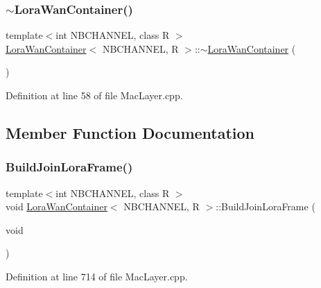 \subsubsection{\texorpdfstring{$\sim$\+Lora\+Wan\+Container()}{~LoraWanContainer()}}
{\footnotesize\ttfamily template$<$int N\+B\+C\+H\+A\+N\+N\+EL, class R $>$ \\
\mbox{\hyperlink{class_lora_wan_container}{Lora\+Wan\+Container}}$<$ N\+B\+C\+H\+A\+N\+N\+EL, R $>$\+::$\sim$\mbox{\hyperlink{class_lora_wan_container}{Lora\+Wan\+Container}} (\begin{DoxyParamCaption}{ }\end{DoxyParamCaption})}



Definition at line 58 of file Mac\+Layer.\+cpp.



\subsection{Member Function Documentation}
\mbox{\label{class_lora_wan_container_a6ae2e50f7bc0eb014745ac1e2f48d0af}} 
\subsubsection{\texorpdfstring{Build\+Join\+Lora\+Frame()}{BuildJoinLoraFrame()}}
{\footnotesize\ttfamily template$<$int N\+B\+C\+H\+A\+N\+N\+EL, class R $>$ \\
void \mbox{\hyperlink{class_lora_wan_container}{Lora\+Wan\+Container}}$<$ N\+B\+C\+H\+A\+N\+N\+EL, R $>$\+::Build\+Join\+Lora\+Frame (\begin{DoxyParamCaption}\item[{void}]{ }\end{DoxyParamCaption})}



Definition at line 714 of file Mac\+Layer.\+cpp.

\mbox{\label{class_lora_wan_container_a6f0a9f6cddbd54a1fc5dd4c6de790d88}} 

